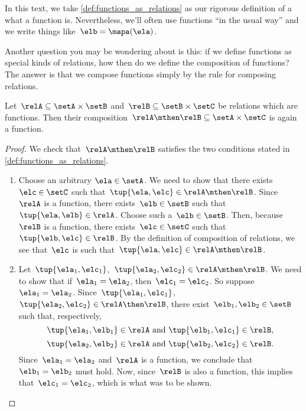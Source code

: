 In this text, we take \cref{def:functions_as_relations} as our rigorous definition of a what a function is. Nevertheless, we'll often use functions ``in the usual way'' and we write things like~$\elb = \mapa(\ela)$.

Another question you may be wondering about is this: if we define functions as special kinds of relations, how then do we define the composition of functions? The answer is that we compose functions simply by the rule for composing relations.

\begin{lemma}
    \label{lem:comprelfun}
    Let~$\relA \subseteq \setA \times \setB$ and~$\relB \subseteq \setB \times \setC$ be relations which are functions. Then their composition~$\relA \mthen \relB \subseteq \setA \times \setC$ is again a function.
\end{lemma}

\begin{proof}
    We check that~$\relA \mthen \relB$ satisfies the two conditions stated in \cref{def:functions_as_relations}.

    \begin{enumerate}
        \item Choose an arbitrary $\ela \in \setA$. We need to show that there exists~$\elc \in \setC$ such that~$\tup{\ela,\elc} \in \relA \mthen \relB$. Since~$\relA$ is a function, there exists~$\elb \in \setB$ such that~$\tup{\ela,\elb} \in \relA$. Choose such a~$\elb \in \setB$. Then, because~$\relB$ is a function, there exists~$\elc \in \setC$ such that~$\tup{\elb,\elc} \in \relB$. By the definition of composition of relations, we see that~$\elc$ is such that~$\tup{\ela,\elc} \in \relA \mthen \relB$.
        \item Let~$\tup{\ela_1, \elc_1}$,~$\tup{\ela_2,\elc_2} \in \relA \mthen \relB$. We need to show that if~$\ela_1 = \ela_2$, then~$\elc_1 = \elc_2$. So suppose~$\ela_1 = \ela_2$. Since~$\tup{\ela_1, \elc_1}$,~$\tup{\ela_2,\elc_2} \in \relA \then \relB$, there exist~$\elb_1, \elb_2 \in \setB$ such that, respectively,
        \begin{equation*}
            \tup{\ela_1, \elb_1} \in \relA \text{ and } \tup{\elb_1, \elc_1} \in \relB,
        \end{equation*}
        \begin{equation*}
            \tup{\ela_2, \elb_2} \in \relA \text{ and } \tup{\elb_2, \elc_2} \in \relB.
        \end{equation*}
        Since~$\ela_1 = \ela_2$ and~$\relA$ is a function, we conclude that~$\elb_1 = \elb_2$ must hold. Now, since~$\relB$ is also a function, this implies that~$\elc_1 = \elc_2$, which is what was to be shown.
    \end{enumerate}
\end{proof}

